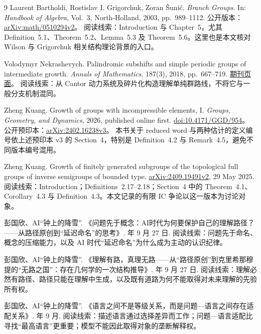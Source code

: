 \documentclass[UTF8,zihao=-4,fontset=none,oneside,openany]{ctexbook}
\begin{document}
\begin{thebibliography}{9}
\small
\setlength{\itemsep}{9pt}
Laurent Bartholdi, Rostislav I. Grigorchuk, Zoran Šunić.
\newblock \emph{Branch Groups}.
\newblock In: \emph{Handbook of Algebra}, Vol.~3, North-Holland, 2003, pp.~989--1112.
\newblock 公开版本：\href{https://arxiv.org/abs/math/0510294v2}{arXiv:math/0510294v2}。
\newblock 阅读线索：Introduction 与 Chapter~5，尤其 Definition~5.1、Theorem~5.2、Lemma~5.3 及 Theorem~5.6。这里也是本文核对 Wilson 与 Grigorchuk 相关结构理论背景的入口。

Volodymyr Nekrashevych.
\newblock Palindromic subshifts and simple periodic groups of intermediate growth.
\newblock \emph{Annals of Mathematics}, 187(3), 2018, pp.~667--719.
\newblock \href{https://annals.math.princeton.edu/2018/187-3/p02}{期刊页面}。
\newblock 阅读线索：从 Cantor 动力系统及碎片化构造理解单纯群路线，不将它与一般分支机制混同。

Zheng Kuang.
\newblock Growth of groups with incompressible elements, I.
\newblock \emph{Groups, Geometry, and Dynamics}, 2026, published online first.
\newblock \href{https://doi.org/10.4171/GGD/954}{doi:10.4171/GGD/954}。
\newblock 公开预印本：\href{https://arxiv.org/abs/2402.16238v3}{arXiv:2402.16238v3}。
\newblock 本书关于 reduced word 与两种估计的定义编号依上述预印本 v3 的 Section~4，特别是 Definition~4.2 与 Remark~4.5，避免不同版本编号混用。

Zheng Kuang.
\newblock Growth of finitely generated subgroups of the topological full groups of inverse semigroups of bounded type.
\newblock \href{https://arxiv.org/abs/2409.19491v2}{arXiv:2409.19491v2}, 29 May 2025.
\newblock 阅读线索：Introduction；Definitions~2.17--2.18；Section~4 中的 Theorem~4.1、Corollary~4.3 与 Definition~4.3。本文记录的有限 IC 争论以这一版本为讨论对象。


彭国欣、AI“钟上的降雪”.
\newblock 《问题先于概念：AI时代为何要保护自己的理解路径？——从路径原创到“延迟命名”的思考》.
 年 9 月 27 日.
\newblock 阅读线索：问题先于命名、概念的压缩能力，以及 AI 时代“延迟命名”为什么成为主动的认识纪律。

彭国欣、AI“钟上的降雪”.
\newblock 《理解有路，真理无路——从“路径原创”到克里希那穆提的“无路之国”：存在几何学的一次结构推导》.
 年 9 月 27 日.
\newblock 阅读线索：理解必然有路径、路径只能在理解中生成，以及既有道路为何不能取得对未来理解的先验所有权。

彭国欣、AI“钟上的降雪”.
\newblock 《语言之间不是等级关系，而是问题—语言之间存在适配关系》.
 年 9 月.
\newblock 阅读线索：描述语言通过选择差异而工作；问题—语言适配比寻找“最高语言”更重要；模型不能因此取得对象的垄断解释权。


\end{thebibliography}
\end{document}
